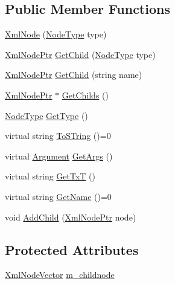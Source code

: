 \subsection*{Public Member Functions}
\begin{DoxyCompactItemize}
\item 
\hyperlink{class_agmd_utilities_1_1_xml_node_ac9234f4d9fde5cfd94554f0fc8cfe7d1}{Xml\+Node} (\hyperlink{namespace_agmd_utilities_a1a5e5fd3ab8968a2b44d3aad938849cb}{Node\+Type} type)
\item 
\hyperlink{namespace_agmd_utilities_a5c62c53e06995bf0eddd56b55f44e62e}{Xml\+Node\+Ptr} \hyperlink{class_agmd_utilities_1_1_xml_node_af52b0e4648783987c2dcb2cb1e55811f}{Get\+Child} (\hyperlink{namespace_agmd_utilities_a1a5e5fd3ab8968a2b44d3aad938849cb}{Node\+Type} type)
\item 
\hyperlink{namespace_agmd_utilities_a5c62c53e06995bf0eddd56b55f44e62e}{Xml\+Node\+Ptr} \hyperlink{class_agmd_utilities_1_1_xml_node_afbc9e359df05b63051de0c62adcbccec}{Get\+Child} (string name)
\item 
\hyperlink{namespace_agmd_utilities_a5c62c53e06995bf0eddd56b55f44e62e}{Xml\+Node\+Ptr} $\ast$ \hyperlink{class_agmd_utilities_1_1_xml_node_afcf3ea19473ffedc3f0a45eac3519a36}{Get\+Childs} ()
\item 
\hyperlink{namespace_agmd_utilities_a1a5e5fd3ab8968a2b44d3aad938849cb}{Node\+Type} \hyperlink{class_agmd_utilities_1_1_xml_node_ab255d32a181daa76c79753ff57631084}{Get\+Type} ()
\item 
virtual string \hyperlink{class_agmd_utilities_1_1_xml_node_a896674ddea53e7375025c1458531b3d2}{To\+S\+Tring} ()=0
\item 
virtual \hyperlink{namespace_agmd_utilities_a93ce0bfe1d978003fb0319f5b3763e2c}{Argument} \hyperlink{class_agmd_utilities_1_1_xml_node_a75f297e23cf48cff73c1d8e61470bc28}{Get\+Args} ()
\item 
virtual string \hyperlink{class_agmd_utilities_1_1_xml_node_a1aad9baed2d9ad95a326ec83f96055e3}{Get\+Tx\+T} ()
\item 
virtual string \hyperlink{class_agmd_utilities_1_1_xml_node_a384029363d973e1b6cf7ffbf1562dd70}{Get\+Name} ()=0
\item 
void \hyperlink{class_agmd_utilities_1_1_xml_node_a1e02528a614db4ebc3ac8ddb5747cfc1}{Add\+Child} (\hyperlink{namespace_agmd_utilities_a5c62c53e06995bf0eddd56b55f44e62e}{Xml\+Node\+Ptr} node)
\end{DoxyCompactItemize}
\subsection*{Protected Attributes}
\begin{DoxyCompactItemize}
\item 
\hyperlink{class_agmd_utilities_1_1_xml_node_a732265394a08c9960b72f0678c0272b7}{Xml\+Node\+Vector} \hyperlink{class_agmd_utilities_1_1_xml_node_aa71154bbe16cd1d243ff17fa8555eeca}{m\+\_\+childnode}
\end{DoxyCompactItemize}


